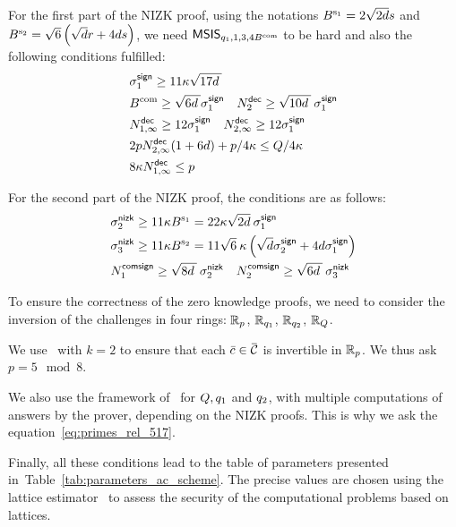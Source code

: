For the first part of the NIZK proof, using the notations $B^{\text{s}_1} = 
2\sqrt{2d}s$ and $B^{\text{s}_2} = \sqrt{6}\left( \sqrt{d} r + 4 d s\right)$, we need
$\mathsf{MSIS}_{q_1, 1,3, 4B^{\text{com}}}$ to be hard and also the following 
conditions fulfilled:
\begin{equation*}
    \begin{split}
        & \sigma^{\mathsf{sign}}_1 \geq 11 \kappa \sqrt{17 d \:}  \\
        & B^{\text{com}} \geq \sqrt{6 d\:} \sigma^{\mathsf{sign}}_1\quad
        N^{\mathsf{dec}}_2 \geq \sqrt{10 d\:}\: \sigma^{\mathsf{sign}}_1\\
        &N^{\mathsf{dec}}_{1, \infty} \geq 12\sigma^{\mathsf{sign}}_1\quad
        N^{\mathsf{dec}}_{2, \infty} \geq 12\sigma^{\mathsf{sign}}_1  \\
        & 2p N^{\mathsf{dec}}_{2, \infty} (1 + 6d) + p/4\kappa \leq Q /4 
\kappa \\
        & 8 \kappa N^{\mathsf{dec}}_{1, \infty} \leq p
    \end{split}
\end{equation*}

For the second part of the NIZK proof, the conditions are as follows:
\begin{align*}
     & \sigma^{\mathsf{nizk}}_2 \geq 11 \kappa B^{\text{s}_1} = 22\kappa \sqrt{2d} \: 
    \sigma^{\mathsf{sign}}_1                                                 \\
     & \sigma^{\mathsf{nizk}}_3 \geq 11 \kappa B^{\text{s}_2} = 11 \sqrt{6}\: \kappa \left(  
\sqrt{d} \sigma^{\mathsf{sign}}_2 + 4 d \sigma^{\mathsf{sign}}_1\right) \\
     & N^{\mathsf{comsign}}_1 \geq \sqrt{8 d\: }\:\sigma^{\mathsf{nizk}}_2 \quad 
N^{\mathsf{comsign}}_2 \geq \sqrt{6 d\: }\: \sigma^{\mathsf{nizk}}_3
\end{align*}

To ensure the correctness of the zero knowledge proofs, we need to consider 
the inversion of the challenges in four rings: $\mathbb{R}_p$, $\mathbb{R}_{q_1}$,
$\mathbb{R}_{q_2}$, $\mathbb{R}_Q$.

We use~\cite[Lemma~2.1]{CCS:delLyuSei18} with $k=2$ to ensure that 
each $\bar{c} \in \SetDiffChallenges$ is invertible in $\mathbb{R}_p$. We thus
ask $p = 5 \mod 8$.

We also use the framework of~\cite{C:AttLyuSei20} for $Q, q_1$ and 
$q_2$, with multiple computations of answers by the prover, depending on
the NIZK proofs. This is why we ask the equation~\eqref{eq:primes_rel_517}.

Finally, all these conditions lead to the table of 
parameters presented in~Table~\ref{tab:parameters_ac_scheme}. 
The precise values are chosen using
the lattice estimator~\cite{DBLP:journals/jmc/AlbrechtPS15} to assess
the security of the computational problems based on lattices.

